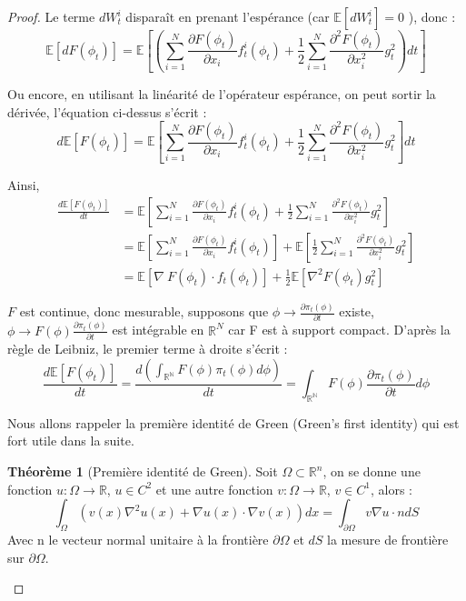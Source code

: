 \documentclass[a4paper,10pt]{article}
\theoremstyle{definition} %
\theoremstyle{definition} %
\theoremstyle{definition} %
\newtheorem{theorem}[definition]{Théorème}
\theoremstyle{definition} %
\newcommand{\E}[1]{\mathbb{E}\left[#1\right]}
\newcommand{\R}{\mathbb{R}}
\begin{document}
\begin{proof}
Le terme $dW_t^i$ disparaît en prenant l'espérance  (car $\mathbb{E}[dW_t^i] = 0$ ), donc :
\[\E{dF(\phi_t)} = \E{\left(\sum\limits_{i=1}^N \frac{\partial F(\phi_t)}{\partial x_i} f^i_t(\phi_t) + \frac{1}{2} \sum\limits_{i=1}^N \frac{\partial^2 F(\phi_t)}{\partial x_i^2} g_t^2\right)dt}\]

Ou encore, en utilisant la linéarité de l'opérateur espérance, on peut sortir la dérivée, l'équation ci-dessus s'écrit :
\[ d\E{F(\phi_t)} = \E{\sum\limits_{i=1}^N \frac{\partial F(\phi_t)}{\partial x_i} f^i_t(\phi_t) + \frac{1}{2} \sum\limits_{i=1}^N \frac{\partial^2 F(\phi_t)}{\partial x_i^2} g_t^2}dt\]

Ainsi,
\begin{align}
    \frac{d\E{F(\phi_t)}}{dt} &= \E{\sum\limits_{i=1}^N \frac{\partial F(\phi_t)}{\partial x_i} f^i_t(\phi_t) + \frac{1}{2} \sum\limits_{i=1}^N  \frac{\partial^2 F(\phi_t)}{\partial x_i^2}g_t^2} \nonumber \\
    &=\E{\sum\limits_{i=1}^N \frac{\partial F(\phi_t)}{\partial x_i} f^i_t(\phi_t)} + \E{\frac{1}{2} \sum\limits_{i=1}^N  \frac{\partial^2 F(\phi_t)}{\partial x_i^2} g_t^2} \nonumber\\
    &=\E{ \nabla\ F(\phi_t) \cdot f_t(\phi_t)} + \frac{1}{2}\E{\nabla^2 F(\phi_t) g_t^2} \label{eq:EsperanceEgality}
\end{align}

$F$ est continue, donc mesurable, supposons que $\phi \rightarrow \frac{\partial\pi_t(\phi)}{\partial t}$ existe, $\phi \rightarrow F(\phi)\frac{\partial\pi_t(\phi)}{\partial t}$ est intégrable en $\R^N$ car F est à support compact. D'après la règle de Leibniz, le premier terme à droite s'écrit :
\[\frac{d\mathbb{E}[F(\phi_t)]}{dt} = \frac{d (\int_{\mathbb{R^N}} F(\phi) \pi_t(\phi) d\phi)} {dt} = \int_{\mathbb{R^N}}F(\phi)\frac{\partial\pi_t(\phi)}{\partial t} d\phi\]
\vspace{2em}

Nous allons rappeler la première identité de Green (Green's first identity) qui est fort utile dans la suite.

\begin{theorem}[Première identité de Green]
Soit $\Omega \subset \R^n$, on se donne une fonction $u : \Omega \rightarrow \R$, $u \in C^2$ et une autre fonction $v : \Omega \rightarrow \R$, $v \in C^1$, alors :
\begin{equation}\label{eq:GreenId}
\int_\Omega (v(x)\nabla^2 u(x) + \nabla u(x) \cdot \nabla v(x)) dx = \int_{\partial\Omega} v \nabla u \cdot n dS
\end{equation}
Avec n le vecteur normal unitaire à la frontière $\partial\Omega$ et $dS$ la mesure de frontière sur $\partial\Omega$.
\end{theorem}
\vspace{3em}


\end{proof}
\end{document}
